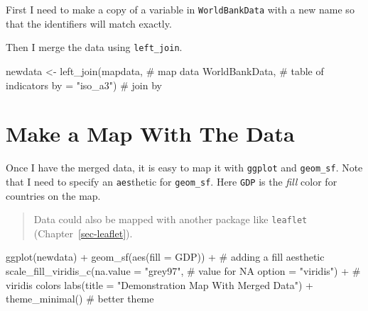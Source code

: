 \documentclass[
  letterpaper,
  DIV=11,
  numbers=noendperiod,
  oneside]{scrreprt}
\newenvironment{Shaded}{\begin{snugshade}}{\end{snugshade}}
\newcommand{\AttributeTok}[1]{\textcolor[rgb]{0.40,0.45,0.13}{#1}}
\newcommand{\CommentTok}[1]{\textcolor[rgb]{0.37,0.37,0.37}{#1}}
\newcommand{\FunctionTok}[1]{\textcolor[rgb]{0.28,0.35,0.67}{#1}}
\newcommand{\NormalTok}[1]{\textcolor[rgb]{0.00,0.23,0.31}{#1}}
\newcommand{\OtherTok}[1]{\textcolor[rgb]{0.00,0.23,0.31}{#1}}
\newcommand{\SpecialCharTok}[1]{\textcolor[rgb]{0.37,0.37,0.37}{#1}}
\newcommand{\StringTok}[1]{\textcolor[rgb]{0.13,0.47,0.30}{#1}}
\begin{document}
First I need to make a copy of a variable in \texttt{WorldBankData} with
a new name so that the identifiers will match exactly.

\begin{Shaded}
\end{Shaded}

Then I merge the data using \texttt{left\_join}.

\begin{Shaded}
\begin{Highlighting}[]
\NormalTok{newdata }\OtherTok{\textless{}{-}} \FunctionTok{left\_join}\NormalTok{(mapdata, }\CommentTok{\# map data}
\NormalTok{                     WorldBankData, }\CommentTok{\# table of indicators}
                     \AttributeTok{by =} \StringTok{"iso\_a3"}\NormalTok{) }\CommentTok{\# join by}
\end{Highlighting}
\end{Shaded}

\section{Make a Map With The Data}\label{make-a-map-with-the-data}

Once I have the merged data, it is easy to map it with \texttt{ggplot}
and \texttt{geom\_sf}. Note that I need to specify an \texttt{aes}thetic
for \texttt{geom\_sf}. Here \texttt{GDP} is the \emph{fill} color for
countries on the map.

\begin{quote}
Data could also be mapped with another package like \texttt{leaflet}
(Chapter~\ref{sec-leaflet}).
\end{quote}

\begin{Shaded}
\begin{Highlighting}[]
\FunctionTok{ggplot}\NormalTok{(newdata) }\SpecialCharTok{+}
  \FunctionTok{geom\_sf}\NormalTok{(}\FunctionTok{aes}\NormalTok{(}\AttributeTok{fill =}\NormalTok{ GDP)) }\SpecialCharTok{+} \CommentTok{\# adding a fill aesthetic}
  \FunctionTok{scale\_fill\_viridis\_c}\NormalTok{(}\AttributeTok{na.value =} \StringTok{"grey97"}\NormalTok{, }\CommentTok{\# value for NA}
                       \AttributeTok{option =} \StringTok{"viridis"}\NormalTok{) }\SpecialCharTok{+} \CommentTok{\# viridis colors}
  \FunctionTok{labs}\NormalTok{(}\AttributeTok{title =} \StringTok{"Demonstration Map With Merged Data"}\NormalTok{) }\SpecialCharTok{+}
  \FunctionTok{theme\_minimal}\NormalTok{() }\CommentTok{\# better theme}
\end{Highlighting}
\end{Shaded}
\end{document}
